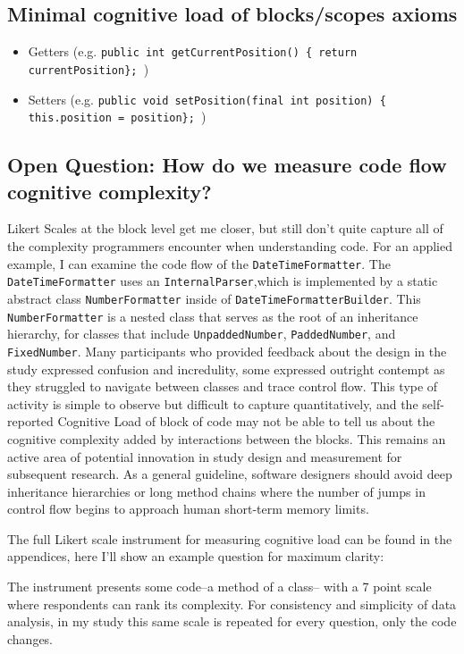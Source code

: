 \subsection{Minimal cognitive load of blocks/scopes axioms}
\begin{itemize}
	\item Getters (e.g. \texttt{public int getCurrentPosition() \{ return currentPosition\}; })
	\item Setters (e.g. \texttt{public void setPosition(final int position) \{ this.position = position\}; })
\end{itemize}
\subsection{Open Question: How do we measure code flow cognitive complexity?}
Likert Scales at the block level get me closer, but still don’t quite capture all of the complexity programmers encounter when understanding code. For an applied example, I can examine the code flow of the \texttt{DateTimeFormatter}. The \texttt{DateTimeFormatter} uses an \texttt{InternalParser},which is implemented by a static abstract class \texttt{NumberFormatter} inside of \texttt{DateTimeFormatterBuilder}. This \texttt{NumberFormatter} is a nested class that serves as the root of an inheritance hierarchy, for classes that include \texttt{UnpaddedNumber}, \texttt{PaddedNumber}, and \texttt{FixedNumber}. Many participants who provided feedback about the design in the study expressed confusion and incredulity, some expressed outright contempt as they struggled to navigate between classes and trace control flow. This type of activity is simple to observe but difficult to capture quantitatively, and the self-reported Cognitive Load of block of code may not be able to tell us about the cognitive complexity added by interactions between the blocks. This remains an active area of potential innovation in study design and measurement for subsequent research. As a general guideline, software designers should avoid deep inheritance hierarchies or long method chains where the number of jumps in control flow begins to approach human short-term memory limits. 

The full Likert scale instrument for measuring cognitive load can be found in the appendices, here I’ll show an example question for maximum clarity:

The instrument presents some code--a method of a class-- with a 7 point scale where respondents can rank its complexity. For consistency and simplicity of data analysis, in my study this same scale is repeated for every question, only the code changes.

